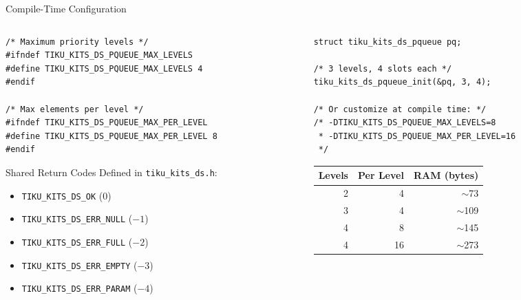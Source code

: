 \documentclass[aspectratio=169, 10pt]{beamer}
\begin{document}
\begin{frame}[fragile]{Compile-Time Configuration}
\begin{columns}[T]
\begin{column}{0.48\textwidth}
\begin{lstlisting}[style=cstyle,
  title={Configurable parameters}]
/* Maximum priority levels */
#ifndef TIKU_KITS_DS_PQUEUE_MAX_LEVELS
#define TIKU_KITS_DS_PQUEUE_MAX_LEVELS 4
#endif

/* Max elements per level */
#ifndef TIKU_KITS_DS_PQUEUE_MAX_PER_LEVEL
#define TIKU_KITS_DS_PQUEUE_MAX_PER_LEVEL 8
#endif
\end{lstlisting}

\vspace{0.3em}
\begin{block}{Shared Return Codes}
Defined in \texttt{tiku\_kits\_ds.h}:
\begin{itemize}
  \item \texttt{TIKU\_KITS\_DS\_OK} (0)
  \item \texttt{TIKU\_KITS\_DS\_ERR\_NULL} ($-1$)
  \item \texttt{TIKU\_KITS\_DS\_ERR\_FULL} ($-2$)
  \item \texttt{TIKU\_KITS\_DS\_ERR\_EMPTY} ($-3$)
  \item \texttt{TIKU\_KITS\_DS\_ERR\_PARAM} ($-4$)
\end{itemize}
\end{block}
\end{column}

\begin{column}{0.48\textwidth}
\begin{lstlisting}[style=cstyle,
  title={Runtime initialization}]
struct tiku_kits_ds_pqueue pq;

/* 3 levels, 4 slots each */
tiku_kits_ds_pqueue_init(&pq, 3, 4);

/* Or customize at compile time: */
/* -DTIKU_KITS_DS_PQUEUE_MAX_LEVELS=8
 * -DTIKU_KITS_DS_PQUEUE_MAX_PER_LEVEL=16
 */
\end{lstlisting}

\vspace{0.3em}
\begin{table}
\centering
\scriptsize
\begin{tabular}{@{}rrr@{}}
\toprule
\textbf{Levels} & \textbf{Per Level} & \textbf{RAM (bytes)} \\
\midrule
2 & 4  & $\sim$73 \\
3 & 4  & $\sim$109 \\
4 & 8  & $\sim$145 \\
4 & 16 & $\sim$273 \\
\bottomrule
\end{tabular}
\end{table}
\end{column}
\end{columns}
\end{frame}
\end{document}

